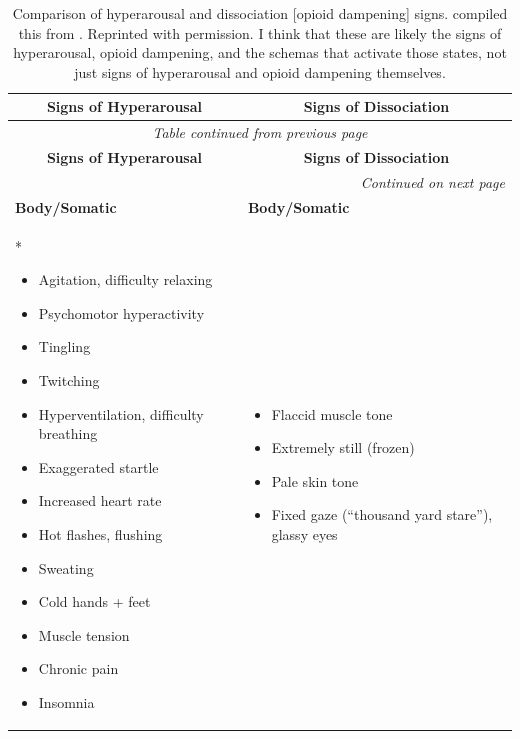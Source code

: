 \documentclass[11pt,oneside]{book}
\newenvironment{compactitemize}
{\begin{itemize}[nosep, leftmargin=1em, itemsep=0pt, topsep=0pt]}
{\end{itemize}}
\begin{document}
\begin{longtable}{p{}|p{}}
\caption{Comparison of hyperarousal and dissociation [opioid dampening] signs. \textcite{cheetahSigns} compiled this from \textcite{ogden2006sensorimotor,magyari2016teaching,treleaven2018trauma}. Reprinted with permission. I think that these are likely the signs of hyperarousal, opioid dampening, and the schemas that activate those states, not just signs of hyperarousal and opioid dampening themselves.} \label{sec:signsofdc} \\

\toprule
\multicolumn{1}{c|}{\textbf{Signs of Hyperarousal}} & \multicolumn{1}{c}{\textbf{Signs of Dissociation}} \\
\midrule
\endfirsthead

\multicolumn{2}{c}{\textit{Table continued from previous page}} \\
\toprule
\multicolumn{1}{c|}{\textbf{Signs of Hyperarousal}} & \multicolumn{1}{c}{\textbf{Signs of Dissociation}} \\
\midrule
\endhead

\midrule
\multicolumn{2}{r}{\textit{Continued on next page}} \\
\endfoot

\bottomrule
\endlastfoot

\textbf{Body/Somatic} & \textbf{Body/Somatic} \\*
\begin{compactitemize}
\item Agitation, difficulty relaxing
\item Psychomotor hyperactivity
\item Tingling
\item Twitching
\item Hyperventilation, difficulty breathing
\item Exaggerated startle
\item Increased heart rate
\item Hot flashes, flushing
\item Sweating
\item Cold hands + feet
\item Muscle tension
\item Chronic pain
\item Insomnia
\end{compactitemize}
&
\begin{compactitemize}
\item Flaccid muscle tone
\item Extremely still (frozen)
\item Pale skin tone
\item Fixed gaze (\enquote{thousand yard stare}), glassy eyes
\end{compactitemize} \\


\end{longtable}
\end{document}
